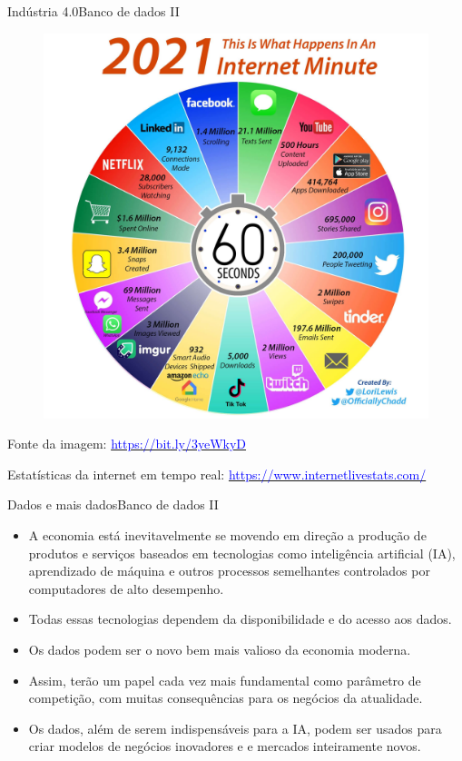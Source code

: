 \documentclass[t]{beamer}
\begin{document}
\begin{ftst}{Indústria 4.0}{Banco de dados II}

\begin{figure}
    \centering
    \includegraphics[scale=0.09]{Figuras/slide00_03.jpg}
\end{figure}

\scriptsize
Fonte da imagem: \href{https://bit.ly/3yeWkyD}{\textcolor{blue}{https://bit.ly/3yeWkyD}} 
 
Estatísticas da internet em tempo real: \href{https://www.internetlivestats.com/}{\textcolor{blue}{https://www.internetlivestats.com/}}

\end{ftst}



\begin{ftst}{Dados e mais dados}{Banco de dados II}
\small
\begin{itemize}
    \item A economia está inevitavelmente se movendo em direção a produção de produtos e serviços baseados em tecnologias como inteligência artificial (IA), aprendizado de máquina e outros processos semelhantes controlados por computadores de alto desempenho.
    \item Todas essas tecnologias dependem da disponibilidade e do acesso aos dados.
    \item Os dados podem ser o novo bem mais valioso da economia moderna.
    \item Assim, terão um papel cada vez mais fundamental como parâmetro de competição, com muitas consequências para os negócios da atualidade.
    \item Os dados, além de serem indispensáveis para a IA, podem ser usados para criar modelos de negócios inovadores e e mercados inteiramente novos.
\end{itemize}

\end{ftst}
\end{document}
